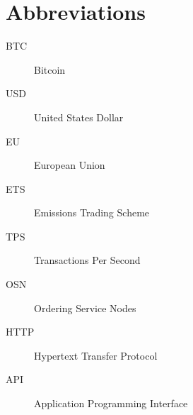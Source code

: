 \chapter*{Abbreviations}\label{abbr}
\begin{description}
    \item[BTC] Bitcoin
    \item[USD] United States Dollar
    \item[EU] European Union
    \item[ETS] Emissions Trading Scheme
    \item[TPS] Transactions Per Second
    \item[OSN] Ordering Service Nodes
    \item[HTTP] Hypertext Transfer Protocol
    \item[API] Application Programming Interface
\end{description}
